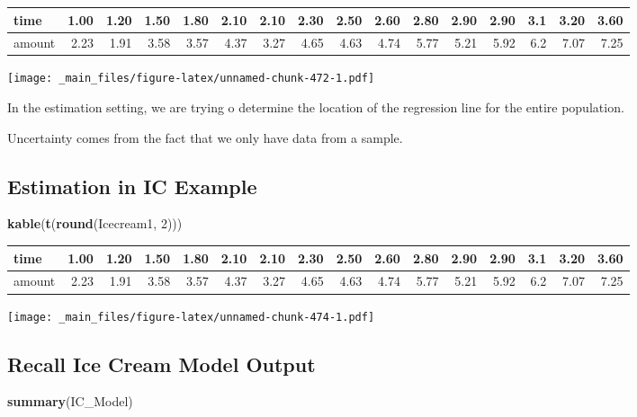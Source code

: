 \documentclass[]{book}
\newenvironment{Shaded}{\begin{snugshade}}{\end{snugshade}}
\newcommand{\KeywordTok}[1]{\textcolor[rgb]{0.13,0.29,0.53}{\textbf{#1}}}
\newcommand{\DecValTok}[1]{\textcolor[rgb]{0.00,0.00,0.81}{#1}}
\newcommand{\NormalTok}[1]{#1}
\begin{document}
\begin{tabular}{l|r|r|r|r|r|r|r|r|r|r|r|r|r|r|r}
\hline
time & 1.00 & 1.20 & 1.50 & 1.80 & 2.10 & 2.10 & 2.30 & 2.50 & 2.60 & 2.80 & 2.90 & 2.90 & 3.1 & 3.20 & 3.60\\
\hline
amount & 2.23 & 1.91 & 3.58 & 3.57 & 4.37 & 3.27 & 4.65 & 4.63 & 4.74 & 5.77 & 5.21 & 5.92 & 6.2 & 7.07 & 7.25\\
\hline
\end{tabular}

\texttt{[image: \_main\_files/figure-latex/unnamed-chunk-472-1.pdf]}

In the estimation setting, we are trying o determine the location of the
regression line for the entire population.

Uncertainty comes from the fact that we only have data from a sample.

\subsection{Estimation in IC Example}\label{estimation-in-ic-example-1}

\begin{Shaded}
\begin{Highlighting}[]
\KeywordTok{kable}\NormalTok{(}\KeywordTok{t}\NormalTok{(}\KeywordTok{round}\NormalTok{(Icecream1, }\DecValTok{2}\NormalTok{)))}
\end{Highlighting}
\end{Shaded}

\begin{tabular}{l|r|r|r|r|r|r|r|r|r|r|r|r|r|r|r}
\hline
time & 1.00 & 1.20 & 1.50 & 1.80 & 2.10 & 2.10 & 2.30 & 2.50 & 2.60 & 2.80 & 2.90 & 2.90 & 3.1 & 3.20 & 3.60\\
\hline
amount & 2.23 & 1.91 & 3.58 & 3.57 & 4.37 & 3.27 & 4.65 & 4.63 & 4.74 & 5.77 & 5.21 & 5.92 & 6.2 & 7.07 & 7.25\\
\hline
\end{tabular}

\texttt{[image: \_main\_files/figure-latex/unnamed-chunk-474-1.pdf]}

\subsection{Recall Ice Cream Model
Output}\label{recall-ice-cream-model-output}

\begin{Shaded}
\begin{Highlighting}[]
\KeywordTok{summary}\NormalTok{(IC_Model)}
\end{Highlighting}
\end{Shaded}
\end{document}
